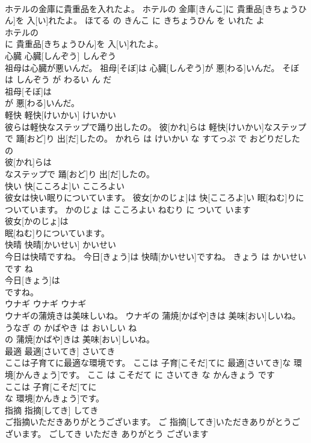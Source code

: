 \documentclass[8pt]{extreport}
\begin{document}
\begin{CJK}{UTF8}{min}
\\	ホテルの金庫に貴重品を入れたよ。	ホテルの 金庫[きんこ]に 貴重品[きちょうひん]を 入[い]れたよ。	ほてる の きんこ に きちょうひん を いれた よ	
\\	ホテルの
\\	に 貴重品[きちょうひん]を 入[い]れたよ。			
\\	心臓	心臓[しんぞう]	しんぞう	
\\	祖母は心臓が悪いんだ。	祖母[そぼ]は 心臓[しんぞう]が 悪[わる]いんだ。	そぼ は しんぞう が わるい ん だ	
\\	祖母[そぼ]は
\\	が 悪[わる]いんだ。			
\\	軽快	軽快[けいかい]	けいかい	
\\	彼らは軽快なステップで踊り出したの。	彼[かれ]らは 軽快[けいかい]なステップで 踊[おど]り 出[だ]したの。	かれら は けいかい な すてっぷ で おどりだした の	
\\	彼[かれ]らは
\\	なステップで 踊[おど]り 出[だ]したの。			
\\	快い	快[こころよ]い	こころよい	
\\	彼女は快い眠りについています。	彼女[かのじょ]は 快[こころよ]い 眠[ねむ]りについています。	かのじょ は こころよい ねむり に ついて います	
\\	彼女[かのじょ]は
\\	眠[ねむ]りについています。			
\\	快晴	快晴[かいせい]	かいせい	
\\	今日は快晴ですね。	今日[きょう]は 快晴[かいせい]ですね。	きょう は かいせい です ね	
\\	今日[きょう]は
\\	ですね。			
\\	ウナギ	ウナギ	ウナギ	
\\	ウナギの蒲焼きは美味しいね。	ウナギの 蒲焼[かばや]きは 美味[おい]しいね。	うなぎ の かばやき は おいしい ね	
\\	の 蒲焼[かばや]きは 美味[おい]しいね。			
\\	最適	最適[さいてき]	さいてき	
\\	ここは子育てに最適な環境です。	ここは 子育[こそだ]てに 最適[さいてき]な 環境[かんきょう]です。	ここ は こそだて に さいてき な かんきょう です	
\\	ここは 子育[こそだ]てに
\\	な 環境[かんきょう]です。			
\\	指摘	指摘[してき]	してき	
\\	ご指摘いただきありがとうございます。	ご 指摘[してき]いただきありがとうございます。	ごしてき いただき ありがとう ございます	

\end{CJK}
\end{document}
